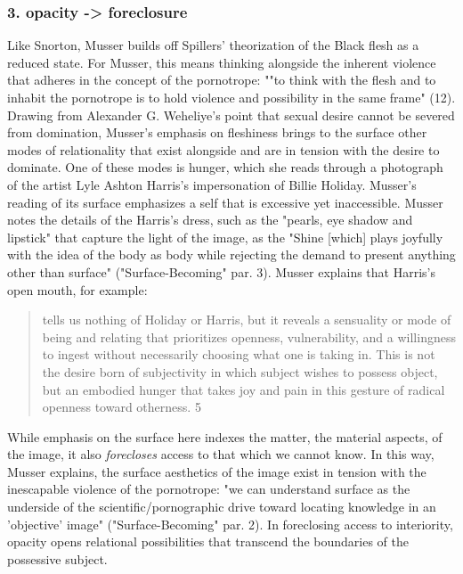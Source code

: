 \documentclass[11pt]{article}
\begin{document}
\subsubsection{3. opacity -> foreclosure}
\label{sec:org36a4f85}
Like Snorton, Musser builds off Spillers' theorization of the Black
flesh as a reduced state. For Musser, this means thinking alongside
the inherent violence that adheres in the concept of the pornotrope:
""to think with the flesh and to inhabit the pornotrope is to hold
violence and possibility in the same frame" (12). Drawing from
Alexander G. Weheliye's point that sexual desire cannot be severed
from domination, Musser's emphasis on fleshiness brings to the surface
other modes of relationality that exist alongside and are in tension
with the desire to dominate. One of these modes is hunger, which she
reads through a photograph of the artist Lyle Ashton Harris's
impersonation of Billie Holiday. Musser's reading of its surface
emphasizes a self that is excessive yet inaccessible. Musser notes the
details of the Harris's dress, such as the "pearls, eye shadow and
lipstick" that capture the light of the image, as the "Shine [which]
plays joyfully with the idea of the body as body while rejecting the
demand to present anything other than surface" ("Surface-Becoming"
par. 3). Musser explains that Harris's open mouth, for example: 
\begin{quote}
tells us nothing of Holiday or Harris, but it reveals a sensuality or
mode of being and relating that prioritizes openness, vulnerability,
and a willingness to ingest without necessarily choosing what one is
taking in. This is not the desire born of subjectivity in which
subject wishes to possess object, but an embodied hunger that takes
joy and pain in this gesture of radical openness toward otherness. 5
\end{quote}
While emphasis on the surface here indexes the matter, the material
aspects, of the image, it also \emph{forecloses} access to that which we
cannot know. In this way, Musser explains, the surface aesthetics of
the image exist in tension with the inescapable violence of the
pornotrope: "we can understand surface as the underside of the
scientific/pornographic drive toward locating knowledge in an
'objective' image" ("Surface-Becoming" par. 2). In foreclosing access
to interiority, opacity opens relational possibilities that transcend
the boundaries of the possessive subject.
\end{document}

